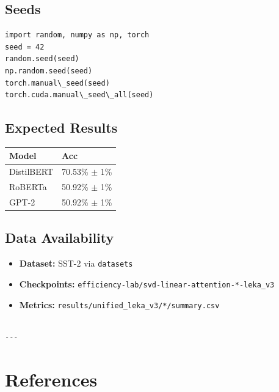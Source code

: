 \subsection{Seeds}

\begin{lstlisting}
import random, numpy as np, torch
seed = 42
random.seed(seed)
np.random.seed(seed)
torch.manual\_seed(seed)
torch.cuda.manual\_seed\_all(seed)
\end{lstlisting}

\subsection{Expected Results}

\begin{table}[H]
\centering
\small
\begin{tabular}{ll}
\toprule
\textbf{Model} & \textbf{Acc} \\
\midrule
DistilBERT & 70.53\% $\pm$ 1\% \\
RoBERTa & 50.92\% $\pm$ 1\% \\
GPT-2 & 50.92\% $\pm$ 1\% \\
\bottomrule
\end{tabular}
\end{table}

\subsection{Data Availability}

\begin{itemize}
\item \textbf{Dataset:} SST-2 via \texttt{datasets}
\item \textbf{Checkpoints:} \texttt{efficiency-lab/svd-linear-attention-*-leka\_v3}
\item \textbf{Metrics:} \texttt{results/unified\_leka\_v3/*/summary.csv}
\end{itemize}
\begin{lstlisting}

---
\end{lstlisting}

\section{References}

